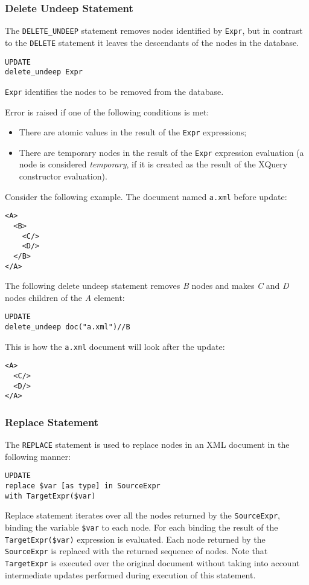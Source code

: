 \documentclass[a4paper,12pt]{article}
\begin{document}
\subsubsection*{Delete Undeep Statement}
The \verb!DELETE_UNDEEP! statement removes nodes identified by \verb!Expr!, but
in contrast to the \verb!DELETE! statement it leaves the descendants of the
nodes in the database.

\begin{verbatim}
UPDATE
delete_undeep Expr
\end{verbatim}
\verb!Expr! identifies the nodes to be removed from the database.

Error is raised if one of the following conditions is met:
\begin{itemize}
\item There are atomic values in the result of the \verb!Expr! expressions;
\item There are temporary nodes in the result of the \verb!Expr! expression
evaluation (a node is considered \emph{temporary}, if it is created as the
result of the XQuery constructor evaluation).
\end{itemize}

Consider the following example. The document named \verb!a.xml! before update:
\begin{verbatim}
<A>
  <B>
    <C/>
    <D/>
  </B>
</A>
\end{verbatim}
The following delete undeep statement removes \emph{B} nodes and makes \emph{C}
and \emph{D} nodes children of the \emph{A} element:
\begin{verbatim}
UPDATE
delete_undeep doc("a.xml")//B
\end{verbatim}
This is how the \verb!a.xml! document will look after the update:
\begin{verbatim}
<A>
  <C/>
  <D/>
</A>
\end{verbatim}


\subsubsection*{Replace Statement}
The \verb!REPLACE! statement is used to replace nodes in an XML document in the
following manner:

\begin{verbatim}
UPDATE
replace $var [as type] in SourceExpr
with TargetExpr($var)
\end{verbatim}
Replace statement iterates over all the nodes returned by the \verb!SourceExpr!,
binding the variable \verb!$var! to each node. For each binding the result of
the \verb!TargetExpr($var)! expression is evaluated. Each node returned by the
\verb!SourceExpr! is replaced with the returned sequence of nodes. Note that
\verb!TargetExpr! is executed over the original document without taking into
account intermediate updates performed during execution of this statement.
\end{document}
